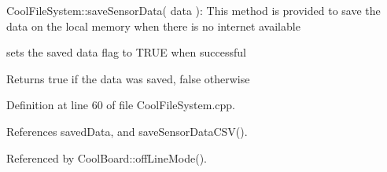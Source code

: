 Cool\+File\+System\+::save\+Sensor\+Data( data )\+: This method is provided to save the data on the local memory when there is no internet available

sets the saved data flag to T\+R\+UE when successful

\begin{DoxyReturn}{Returns}
true if the data was saved, false otherwise 
\end{DoxyReturn}


Definition at line 60 of file Cool\+File\+System.\+cpp.



References saved\+Data, and save\+Sensor\+Data\+C\+S\+V().



Referenced by Cool\+Board\+::off\+Line\+Mode().


